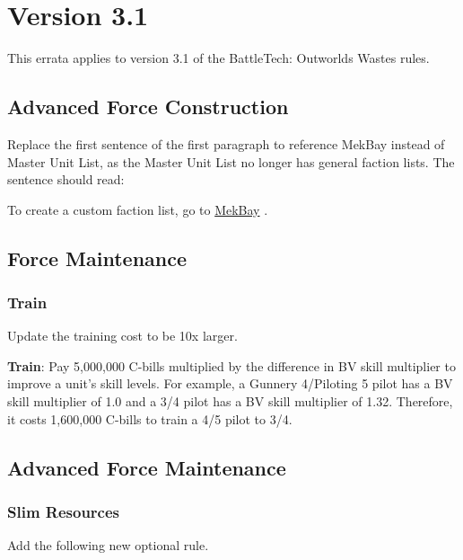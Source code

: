 \section{Version 3.1}

This errata applies to version 3.1 of the BattleTech: Outworlds Wastes rules.

\subsection{Advanced Force Construction}

Replace the first sentence of the first paragraph to reference MekBay instead of Master Unit List, as the Master Unit List no longer has general faction lists.
The sentence should read:

To create a custom faction list, go to \href{http://https://mekbay.com/}{MekBay} .

\subsection{Force Maintenance}

\subsubsection{Train}

Update the training cost to be 10x larger.

\begin{description}

\item {\bfseries Train}: Pay 5,000,000 C-bills multiplied by the difference in BV skill multiplier to improve a unit's skill levels.
For example, a Gunnery 4/Piloting 5 pilot has a BV skill multiplier of 1.0 and a 3/4 pilot has a BV skill multiplier of 1.32.
Therefore, it costs 1,600,000 C-bills to train a 4/5 pilot to 3/4.

\end{description}

\subsection{Advanced Force Maintenance}

\subsubsection{Slim Resources}

Add the following new optional rule.

